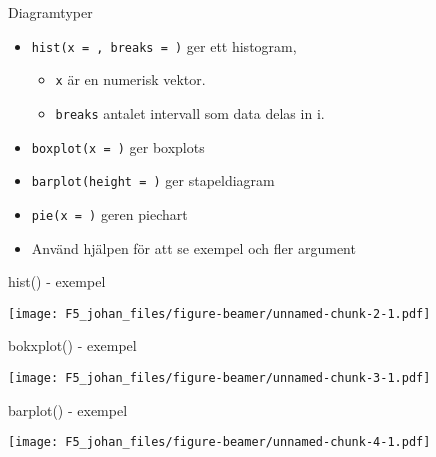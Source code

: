 \documentclass[
  11pt,
  ignorenonframetext,
  handout]{beamer}
\newenvironment{Shaded}{\begin{snugshade}}{\end{snugshade}}
\newcommand{\FunctionTok}[1]{\textcolor[rgb]{0.13,0.29,0.53}{\textbf{#1}}}
\newcommand{\NormalTok}[1]{#1}
\newcommand{\OtherTok}[1]{\textcolor[rgb]{0.56,0.35,0.01}{#1}}
\newcommand{\SpecialCharTok}[1]{\textcolor[rgb]{0.81,0.36,0.00}{\textbf{#1}}}
\providecommand{\tightlist}{%
  \setlength{\itemsep}{0pt}\setlength{\parskip}{0pt}}
\begin{document}
\begin{frame}{Diagramtyper}
\label{diagramtyper}
\begin{itemize}
\tightlist
\item
  \texttt{hist(x = , breaks = )} ger ett histogram,

  \begin{itemize}
  \tightlist
  \item
    \texttt{x} är en numerisk vektor.
  \item
    \texttt{breaks} antalet intervall som data delas in i.
  \end{itemize}
\item
  \texttt{boxplot(x = )} ger boxplots
\item
  \texttt{barplot(height = )} ger stapeldiagram
\item
  \texttt{pie(x = )} geren piechart
\item
  Använd hjälpen för att se exempel och fler argument
\end{itemize}
\end{frame}

\begin{frame}[fragile]{hist() - exempel}
\label{hist---exempel}
\begin{Shaded}
\end{Shaded}

\texttt{[image: F5\_johan\_files/figure-beamer/unnamed-chunk-2-1.pdf]}
\end{frame}

\begin{frame}[fragile]{bokxplot() - exempel}
\label{bokxplot---exempel}
\begin{Shaded}
\end{Shaded}

\texttt{[image: F5\_johan\_files/figure-beamer/unnamed-chunk-3-1.pdf]}
\end{frame}

\begin{frame}[fragile]{barplot() - exempel}
\label{barplot---exempel}
\begin{Shaded}
\end{Shaded}

\texttt{[image: F5\_johan\_files/figure-beamer/unnamed-chunk-4-1.pdf]}
\end{frame}
\end{document}
